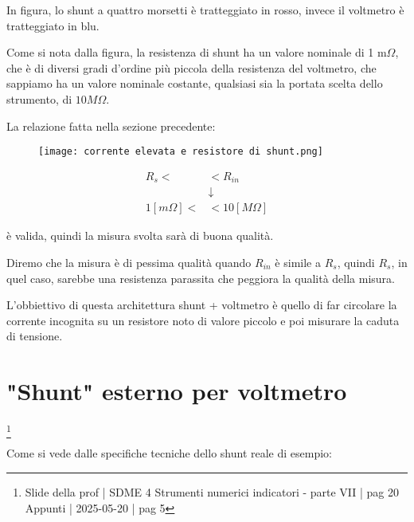 In figura, lo shunt a quattro morsetti è tratteggiato in rosso, invece il voltmetro è tratteggiato in blu. \newline

Come si nota dalla figura, la resistenza di shunt ha un valore nominale di 1 m$\Omega$, che è di diversi gradi d'ordine più piccola della resistenza del voltmetro, 
che sappiamo ha un valore nominale costante, qualsiasi sia la portata scelta dello strumento, di $10 M\Omega$. \newline

La relazione fatta nella sezione precedente: 

\begin{figure}[h]
    \centering
    \texttt{[image: corrente elevata e resistore di shunt.png]}
\end{figure}

{
    \Large 
    \begin{equation}
        \begin{split}
            R_s <&< R_{in}
            \\
            &\downarrow
            \\
            1 [m\Omega] <&< 10 [M\Omega]
        \end{split}
    \end{equation}
}

è valida, quindi la misura svolta sarà di buona qualità. \newline

Diremo che la misura è di pessima qualità quando $R_{in}$ è simile a $R_s$, quindi $R_s$, in quel caso, sarebbe una resistenza parassita che peggiora la qualità della misura. \newline 


L'obbiettivo di questa architettura shunt + voltmetro è quello di far circolare la corrente incognita su un resistore noto di valore piccolo 
e poi misurare la caduta di tensione. \newline 

\newpage 

\section{"Shunt" esterno per voltmetro}
\footnote{Slide della prof | SDME 4 Strumenti numerici indicatori - parte VII | pag 20\\  
Appunti | 2025-05-20 | pag 5 }

Come si vede dalle specifiche tecniche dello shunt reale di esempio: 

